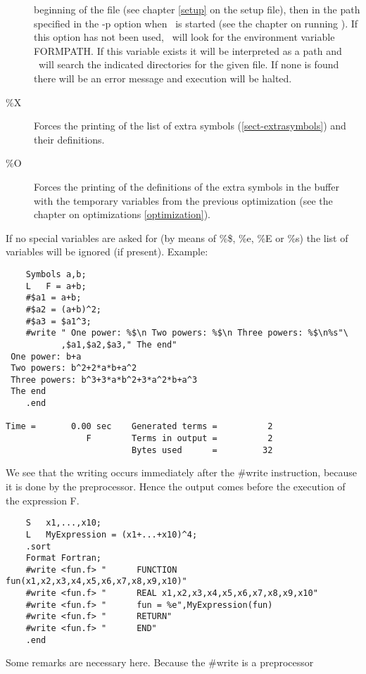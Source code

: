 \begin{description}
beginning of the file (see chapter \ref{setup} on the setup file), then in 
the path specified in the -p option when \FORM\ is started (see the chapter 
on running \FORM). If this option has not been used, \FORM\ will look for the 
environment variable FORMPATH. If this variable exists it 
will be interpreted as a path and \FORM\ will search the indicated 
directories for the given file. If none is found there will be an error 
message and execution will be halted.
\item[\%X] Forces the printing of the list of extra symbols 
(\ref{sect-extrasymbols}) and their definitions.
\item[\%O] Forces the printing of the definitions of the extra symbols in 
the buffer with the temporary variables from the previous optimization (see 
the chapter on optimizations \ref{optimization}). 
\end{description}
If no special variables are asked for (by means of \%\$, \%e, \%E or \%s) 
the list of variables will be ignored (if present). Example:
\begin{verbatim}
    Symbols a,b;
    L   F = a+b;
    #$a1 = a+b;
    #$a2 = (a+b)^2;
    #$a3 = $a1^3;
    #write " One power: %$\n Two powers: %$\n Three powers: %$\n%s"\
           ,$a1,$a2,$a3," The end"
 One power: b+a
 Two powers: b^2+2*a*b+a^2
 Three powers: b^3+3*a*b^2+3*a^2*b+a^3
 The end
    .end

Time =       0.00 sec    Generated terms =          2
                F        Terms in output =          2
                         Bytes used      =         32
\end{verbatim}
We see that the writing occurs immediately after the \#write 
instruction, because it is done by the preprocessor. Hence the output comes 
before the execution of the expression F.
\begin{verbatim}
    S   x1,...,x10;
    L   MyExpression = (x1+...+x10)^4;
    .sort
    Format Fortran;
    #write <fun.f> "      FUNCTION fun(x1,x2,x3,x4,x5,x6,x7,x8,x9,x10)"
    #write <fun.f> "      REAL x1,x2,x3,x4,x5,x6,x7,x8,x9,x10"
    #write <fun.f> "      fun = %e",MyExpression(fun)
    #write <fun.f> "      RETURN"
    #write <fun.f> "      END"
    .end
\end{verbatim}
Some remarks are necessary here. Because the \#write is a preprocessor 
